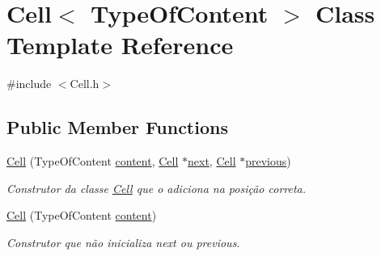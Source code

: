 \hypertarget{classCell}{\section{Cell$<$ Type\+Of\+Content $>$ Class Template Reference}
\label{classCell}
}


{\ttfamily \#include $<$Cell.\+h$>$}

\subsection*{Public Member Functions}
\begin{DoxyCompactItemize}
\item 
\hypertarget{classCell_ac77f84cae445e88ab5396c2013ca842a}{\hyperlink{classCell_ac77f84cae445e88ab5396c2013ca842a}{Cell} (Type\+Of\+Content \hyperlink{classCell_ac969bc8a56a1ddc470f0d398b4017a12}{content}, \hyperlink{classCell}{Cell} $\ast$\hyperlink{classCell_a9f0d28bc50bc81f27390a6d5932dc457}{next}, \hyperlink{classCell}{Cell} $\ast$\hyperlink{classCell_a918f177d29985b59d137cd1aba4e5dcf}{previous})}\label{classCell_ac77f84cae445e88ab5396c2013ca842a}

\begin{DoxyCompactList}\small\item\em Construtor da classe \hyperlink{classCell}{Cell} que o adiciona na posição correta. \end{DoxyCompactList}\item 
\hypertarget{classCell_a8c321d6b19b2d051a1f01231aaa361d2}{\hyperlink{classCell_a8c321d6b19b2d051a1f01231aaa361d2}{Cell} (Type\+Of\+Content \hyperlink{classCell_ac969bc8a56a1ddc470f0d398b4017a12}{content})}\label{classCell_a8c321d6b19b2d051a1f01231aaa361d2}

\begin{DoxyCompactList}\small\item\em Construtor que não inicializa next ou previous. \end{DoxyCompactList}\end{DoxyCompactItemize}
